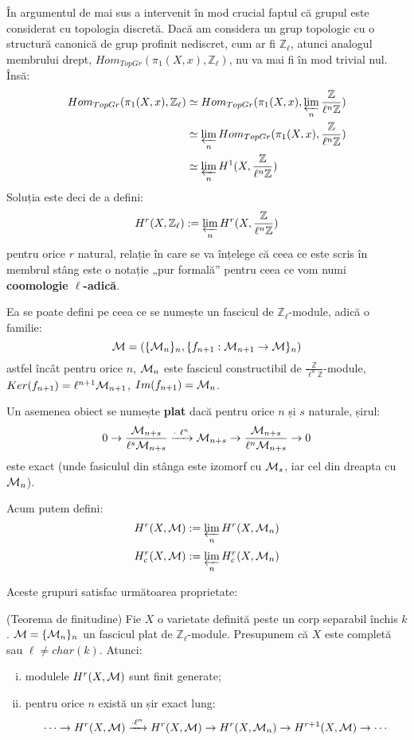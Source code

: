 \documentclass[13pt,openany]{book}
\begin{document}
În argumentul de mai sus a intervenit în mod crucial faptul că grupul este considerat cu topologia discretă. Dacă am considera un grup topologic cu o structură canonică de grup profinit nediscret, cum ar fi $\mathbb{Z}_\ell$, atunci analogul membrului drept, $Hom_{TopGr}(\pi_1(X,x),\mathbb{Z}_\ell)$, nu va mai fi în mod trivial nul. Însă:
\begin{align*}
Hom_{TopGr}(\pi_1(X,x),\mathbb{Z}_\ell)&\simeq Hom_{TopGr}(\pi_1(X,x),\varprojlim_n \frac{\mathbb{Z}}{\ell^n\mathbb{Z}}) \\
&\simeq \varprojlim_n Hom_{TopGr}(\pi_1(X,x), \frac{\mathbb{Z}}{\ell^n\mathbb{Z}}) \\
&\simeq \varprojlim_n H^1(X, \frac{\mathbb{Z}}{\ell^n\mathbb{Z}}) \\
\end{align*}
Soluția este deci de a defini:
$$H^r(X,\mathbb{Z}_\ell):=\varprojlim_n H^r(X, \frac{\mathbb{Z}}{\ell^n\mathbb{Z}})$$
pentru orice $r$ natural, relație în care se va înțelege că ceea ce este scris în membrul stâng este o notație „pur formală” pentru ceea ce vom numi {\bf coomologie $\ell$-adică}.

Ea se poate defini pe ceea ce se numește un fascicul de $\mathbb{Z}_\ell$-module, adică o familie:
$$\mathcal{M}=(\{\mathcal{M}_n\}_n,\{f_{n+1}:\mathcal{M}_{n+1}\rightarrow\mathcal{M}\}_n)$$
astfel încât pentru orice $n$, $\mathcal{M}_n$ este fascicul constructibil de $\frac{\mathbb{Z}}{\ell^n\mathbb{Z}}$-module, $Ker(f_{n+1})=\ell^{n+1}\mathcal{M}_{n+1}$, $Im(f_{n+1})=\mathcal{M}_n$.

Un asemenea obiect se numește {\bf plat} dacă pentru orice $n$ și $s$ naturale, șirul:
$$0 \rightarrow \frac{\mathcal{M}_{n+s}}{\ell^s\mathcal{M}_{n+s}} \xrightarrow{\cdot\ \ell^n} \mathcal{M}_{n+s} \rightarrow \frac{\mathcal{M}_{n+s}}{\ell^n\mathcal{M}_{n+s}} \rightarrow 0$$
este exact (unde fasiculul din stânga este izomorf cu $\mathcal{M}_s$, iar cel din dreapta cu $\mathcal{M}_n$).

Acum putem defini:
$$H^r(X,\mathcal{M}):=\varprojlim_n H^r(X,\mathcal{M}_n)$$
$$H^r_c(X,\mathcal{M}):=\varprojlim_n H^r_c(X,\mathcal{M}_n)$$

Aceste grupuri satisfac următoarea proprietate:

\begin{teo}
(Teorema de finitudine) Fie $X$ o varietate definită peste un corp separabil închis $k$. $\mathcal{M}=\{\mathcal{M}_n\}_n$ un fascicul plat de $\mathbb{Z}_\ell$-module. Presupunem că $X$ este completă sau $\ell \neq char(k)$. Atunci:
\begin{enumerate}[(i)]
\item modulele $H^r(X,\mathcal{M})$ sunt finit generate;
\item pentru orice $n$ există un șir exact lung:
$$\cdots \rightarrow H^r(X,\mathcal{M}) \xrightarrow{\cdot \ell^n} H^r(X,\mathcal{M}) \rightarrow H^r(X,\mathcal{M}_n) \rightarrow H^{r+1}(X,\mathcal{M}) \rightarrow \cdots$$
\end{enumerate}
\end{teo}
\end{document}
